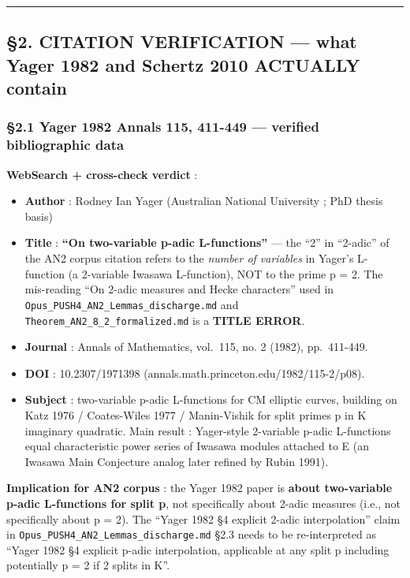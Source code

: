 \documentclass[
  11pt,
  a4paper,
]{article}
\providecommand{\tightlist}{\setlength{\itemsep}{0pt}\setlength{\parskip}{0pt}}
\providecommand{\tightlist}{%
  \setlength{\itemsep}{0pt}\setlength{\parskip}{0pt}}
\begin{document}
\begin{center}\rule{0.5\linewidth}{0.5pt}\end{center}

\hypertarget{citation-verification-what-yager-1982-and-schertz-2010-actually-contain}{%
\subsection{§2. CITATION VERIFICATION --- what Yager 1982 and Schertz 2010 ACTUALLY contain}\label{citation-verification-what-yager-1982-and-schertz-2010-actually-contain}}

\hypertarget{yager-1982-annals-115-411-449-verified-bibliographic-data}{%
\subsubsection{§2.1 Yager 1982 Annals 115, 411-449 --- verified bibliographic data}\label{yager-1982-annals-115-411-449-verified-bibliographic-data}}

\textbf{WebSearch + cross-check verdict} :

\begin{itemize}
\tightlist
\item
  \textbf{Author} : Rodney Ian Yager (Australian National University ; PhD thesis basis)
\item
  \textbf{Title} : \textbf{``On two-variable p-adic L-functions''} --- the ``2'' in ``2-adic'' of the AN2 corpus citation refers to the \emph{number of variables} in Yager's L-function (a 2-variable Iwasawa L-function), NOT to the prime p = 2. The mis-reading ``On 2-adic measures and Hecke characters'' used in \texttt{Opus\_PUSH4\_AN2\_Lemmas\_discharge.md} and \texttt{Theorem\_AN2\_8\_2\_formalized.md} is a \textbf{TITLE ERROR}.
\item
  \textbf{Journal} : Annals of Mathematics, vol.~115, no. 2 (1982), pp.~411-449.
\item
  \textbf{DOI} : 10.2307/1971398 (annals.math.princeton.edu/1982/115-2/p08).
\item
  \textbf{Subject} : two-variable p-adic L-functions for CM elliptic curves, building on Katz 1976 / Coates-Wiles 1977 / Manin-Vishik for split primes p in K imaginary quadratic. Main result : Yager-style 2-variable p-adic L-functions equal characteristic power series of Iwasawa modules attached to E (an Iwasawa Main Conjecture analog later refined by Rubin 1991).
\end{itemize}

\textbf{Implication for AN2 corpus} : the Yager 1982 paper is \textbf{about two-variable p-adic L-functions for split p}, not specifically about 2-adic measures (i.e., not specifically about p = 2). The ``Yager 1982 §4 explicit 2-adic interpolation'' claim in \texttt{Opus\_PUSH4\_AN2\_Lemmas\_discharge.md} §2.3 needs to be re-interpreted as ``Yager 1982 §4 explicit p-adic interpolation, applicable at any split p including potentially p = 2 if 2 splits in K''.
\end{document}
